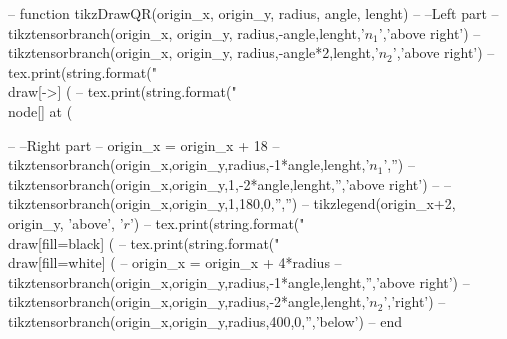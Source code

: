 \begin{luacode*}
-- function tikzDrawQR(origin_x, origin_y, radius, angle, lenght)
--   --Left part
--     tikztensorbranch(origin_x, origin_y, radius,-angle,lenght,'$n_{1}$','above right')
--     tikztensorbranch(origin_x, origin_y, radius,-angle*2,lenght,'$n_{2}$','above right')
--     tex.print(string.format("\\draw[->] (%
--     tex.print(string.format("\\node[] at (%

--   --Right part
--     origin_x = origin_x + 18
--     tikztensorbranch(origin_x,origin_y,radius,-1*angle,lenght,'$n_{1}$','')
--     tikztensorbranch(origin_x,origin_y,1,-2*angle,lenght,'','above right')
--     --tikztensorbranch(origin_x,origin_y,1,180,0,'','')
--     tikzlegend(origin_x+2, origin_y, 'above', '$r$')
--     tex.print(string.format("\\draw[fill=black] (%
--     tex.print(string.format("\\draw[fill=white] (%
--     origin_x = origin_x + 4*radius
--     tikztensorbranch(origin_x,origin_y,radius,-1*angle,lenght,'','above right')
--     tikztensorbranch(origin_x,origin_y,radius,-2*angle,lenght,'$n_{2}$','right')
--     tikztensorbranch(origin_x,origin_y,radius,400,0,'','below')
-- end



\end{luacode*}
